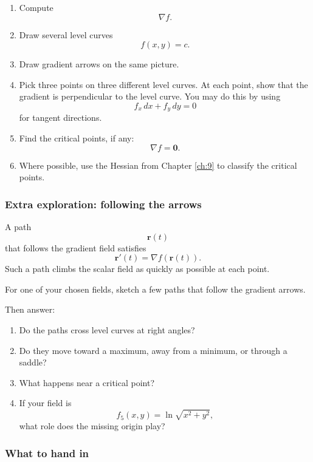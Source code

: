 \begin{enumerate}
\item Compute
\[
    \nabla f.
\]

\item Draw several level curves
\[
    f(x,y)=c.
\]

\item Draw gradient arrows on the same picture.

\item Pick three points on three different level curves.  At each point, show that the
gradient is perpendicular to the level curve.  You may do this by using
\[
    f_x\,dx+f_y\,dy=0
\]
for tangent directions.

\item Find the critical points, if any:
\[
    \nabla f=\mathbf 0.
\]

\item Where possible, use the Hessian from Chapter \ref{ch:9} to classify the critical
points.
\end{enumerate}

\subsubsection*{Extra exploration: following the arrows}

A path
\[
    \mathbf r(t)
\]
that follows the gradient field satisfies
\[
    \mathbf r'(t)=\nabla f(\mathbf r(t)).
\]
Such a path climbs the scalar field as quickly as possible at each point.

For one of your chosen fields, sketch a few paths that follow the gradient arrows.

Then answer:

\begin{enumerate}
\item Do the paths cross level curves at right angles?

\item Do they move toward a maximum, away from a minimum, or through a saddle?

\item What happens near a critical point?

\item If your field is
\[
    f_5(x,y)=\ln\sqrt{x^2+y^2},
\]
what role does the missing origin play?
\end{enumerate}

\subsubsection*{What to hand in}


